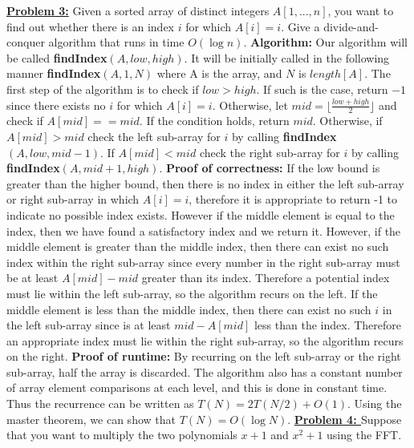 \documentclass[11pt]{article}
\begin{document}
\begin{flushleft}
	\newpage
	\item \textbf {\underline{Problem 3:}} Given a sorted array of distinct integers $A[1, . . . , n]$, you want to
	find out whether there is an index $i$ for which $A[i] = i$. Give a
	divide-and-conquer algorithm that runs in time $O(\log n).$
	\newline
	\newline
	\textbf{Algorithm:} Our algorithm will be called \textbf{findIndex}$(A, low, high)$. It will be initially called in the following manner \textbf{findIndex}$(A, 1, N)$ where A is the array, and $N$ is $length[A]$. The first step of the algorithm is to check if $low > high$. If such is the case, return $-1$ since there exists no $i$ for which $A[i] = i$. Otherwise, let $mid = \lfloor \frac{low + high}{2} \rfloor$ and check if $A[mid] == mid$. If the condition holds, return $mid$. Otherwise, if $A[mid] > mid$ check the left sub-array for $i$ by calling \textbf{findIndex}$(A, low, mid - 1)$. If $A[mid] < mid$ check the right sub-array for $i$ by calling \textbf{findIndex}$(A, mid + 1, high)$. 
	\newline
	\newline
	\textbf{Proof of correctness:} If the low bound is greater than the higher bound, then there is no index in either the left sub-array or right sub-array in which $A[i] = i$, therefore it is appropriate to return -1 to indicate no possible index exists. However if the middle element is equal to the index, then we have found a satisfactory index and we return it. However, if the middle element is greater than the middle index, then there can exist no such index within the right sub-array since every number in the right sub-array must be at least $A[mid] - mid$ greater than its index. Therefore a potential index must lie within the left sub-array, so the algorithm recurs on the left. If the middle element is less than the middle index, then there can exist no such $i$ in the left sub-array since is at least $mid - A[mid]$ less than the index. Therefore an appropriate index must lie within the right sub-array, so the algorithm recurs on the right. 
	\newline
	\newline
	\textbf{Proof of runtime: }By recurring on the left sub-array or the right sub-array, half the array is discarded. The algorithm also has a constant number of array element comparisons at each level, and this is done in constant time. Thus the recurrence can be written as $T(N) = 2T(N / 2) + O(1)$. Using the master theorem, we can show that $T(N) = O(\log N)$.
	\newpage
	\textbf{\underline{Problem 4: }}Suppose that you want to multiply the two polynomials $x + 1$ and $x^2 + 1$
	using the FFT. 


\end{flushleft}
\end{document}
